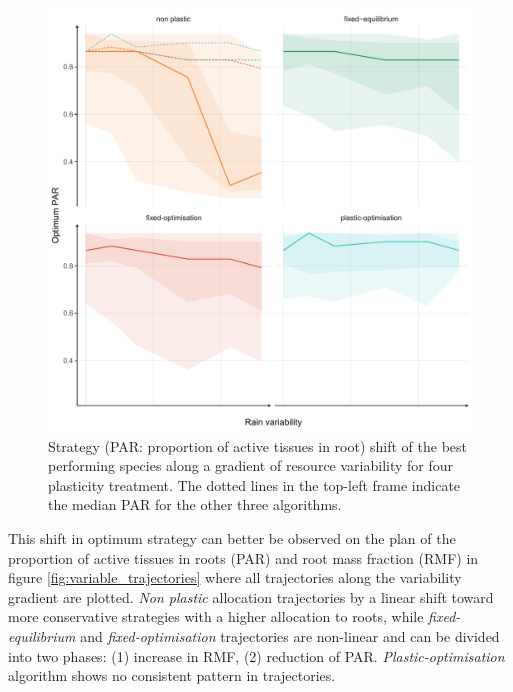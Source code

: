 \begin{figure}\label{fig:variable_strategy}
\includegraphics[width = \textwidth]{./2_PP/Figures/Variable/var_strat_trend.pdf}
\caption[Strategy shift along a gradient of resource variability]{Strategy (PAR: proportion of active tissues in root) shift of the best performing species along a gradient of resource variability for four plasticity treatment. The dotted lines in the top-left frame indicate the median PAR for the other three algorithms.}
\end{figure}

 This shift in optimum strategy can better be observed on the plan of the proportion of active tissues in roots (PAR) and root mass fraction (RMF) in figure \ref{fig:variable_trajectories} where all trajectories along the variability gradient are plotted. \textit{Non plastic} allocation trajectories by a linear shift toward more conservative strategies with a higher allocation to roots, while \textit{fixed-equilibrium} and \textit{fixed-optimisation} trajectories are non-linear and can be divided into two phases: (1) increase in RMF, (2) reduction of PAR. \textit{Plastic-optimisation} algorithm shows no consistent pattern in trajectories.


